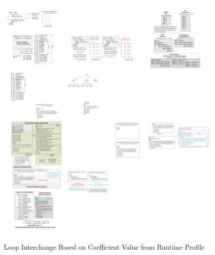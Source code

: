 \begin{figure}[htp]
\begin{center}
\includegraphics[width=0.75\linewidth]{chap6fig/loopInterchange.pdf}
\caption{Loop Interchange Based on Coefficient Value from Runtime Profile 
\label{localityopt}}
\end{center}
\end{figure}

